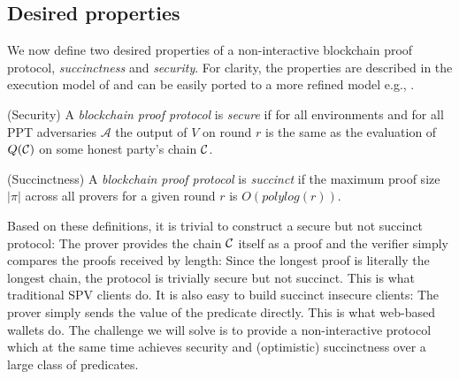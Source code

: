 \subsection{Desired properties}

We now define two desired properties of a non-interactive blockchain proof protocol, \textit{succinctness} and \textit{security}. For clarity, the properties are described in the execution model of \cite{backbone} and can be easily ported to a more refined model e.g., \cite{PSS}.

\begin{definition}{(Security)}
A \textit{blockchain proof protocol} is \textit{secure} if for all environments
and for all PPT adversaries $\mathcal{A}$ the output of $V$ on round $r$ is the
same as the evaluation of $Q(\mathcal{C})$ on some honest party's chain $\mathcal{C}$.
\end{definition}

\begin{definition}{(Succinctness)}
A \textit{blockchain proof protocol} is \textit{succinct} if the maximum proof
size $|\pi|$ across all provers for a given round $r$ is $O(polylog(r))$.
\end{definition}

Based on these definitions, it is trivial to construct a secure but not succinct
protocol: The prover provides the chain $\mathcal{C}$ itself as a proof and the
verifier simply compares the proofs received by length: Since the longest proof
is literally the longest chain, the protocol is trivially secure but not
succinct. This is what traditional SPV clients do. It is also easy to build
succinct insecure clients: The prover simply sends the value of the predicate
directly. This is what web-based wallets do. The challenge we will solve is to
provide a non-interactive protocol which at the same time achieves security and
(optimistic) succinctness over a large class of predicates.
